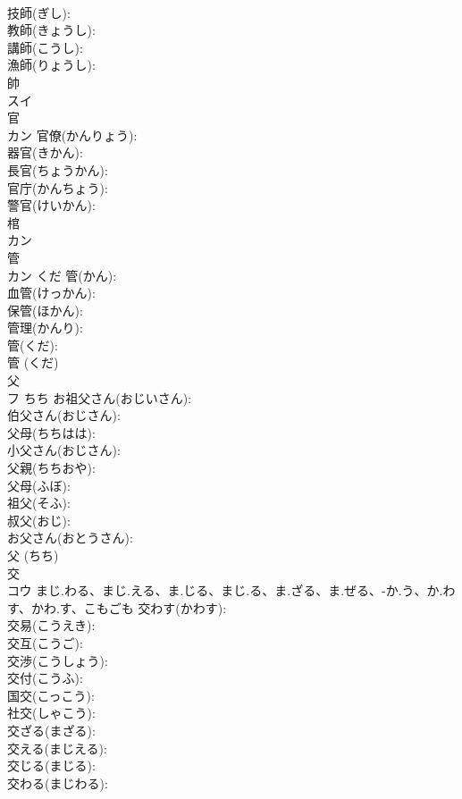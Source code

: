 \documentclass[8pt]{extreport}
\begin{document}
\begin{CJK}{UTF8}{min}
\\	技師(ぎし): 
\\	教師(きょうし): 
\\	講師(こうし): 
\\	漁師(りょうし): 
\\	帥			
\\	スイ			
\\	官			
\\	カン		官僚(かんりょう): 
\\	器官(きかん): 
\\	長官(ちょうかん): 
\\	官庁(かんちょう): 
\\	警官(けいかん): 
\\	棺			
\\	カン			
\\	管			
\\	カン	くだ	管(かん): 
\\	血管(けっかん): 
\\	保管(ほかん): 
\\	管理(かんり): 
\\	管(くだ): 
\\	管 (くだ)
\\	父			
\\	フ	ちち	お祖父さん(おじいさん): 
\\	伯父さん(おじさん): 
\\	父母(ちちはは): 
\\	小父さん(おじさん): 
\\	父親(ちちおや): 
\\	父母(ふぼ): 
\\	祖父(そふ): 
\\	叔父(おじ): 
\\	お父さん(おとうさん): 
\\	父 (ちち)
\\	交			
\\	コウ	まじ.わる、まじ.える、ま.じる、まじ.る、ま.ざる、ま.ぜる、-か.う、か.わす、かわ.す、こもごも	交わす(かわす): 
\\	交易(こうえき): 
\\	交互(こうご): 
\\	交渉(こうしょう): 
\\	交付(こうふ): 
\\	国交(こっこう): 
\\	社交(しゃこう): 
\\	交ざる(まざる): 
\\	交える(まじえる): 
\\	交じる(まじる): 
\\	交わる(まじわる): 

\end{CJK}
\end{document}
